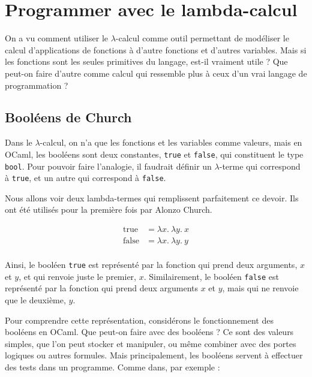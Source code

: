 \documentclass[11pt]{article}
\begin{document}
\section{Programmer avec le lambda-calcul}
On a vu comment utiliser le $\lambda$-calcul comme outil permettant de modéliser le calcul d'applications de fonctions à d'autre fonctions et d'autres variables. Mais si les fonctions sont les seules primitives du langage, est-il vraiment utile ? Que peut-on faire d'autre comme calcul qui ressemble plus à ceux d'un vrai langage de programmation ?

\subsection{Booléens de Church}
Dans le $\lambda$-calcul, on n'a que les fonctions et les variables comme valeurs, mais en OCaml, les booléens sont deux constantes, \verb|true| et \verb|false|, qui constituent le type \verb|bool|. Pour pouvoir faire l'analogie, il faudrait définir un $\lambda$-terme qui correspond à \verb|true|, et un autre qui correspond à \verb|false|.

Nous allons voir deux lambda-termes qui remplissent parfaitement ce devoir. Ils ont été utilisés pour la première fois par Alonzo Church.

\begin{definition}
    \begin{equation*}
    \begin{aligned}
        \operatorname{true} &= \lambda x.~\lambda y.~x\\
        \operatorname{false} &= \lambda x.~\lambda y.~y\\
    \end{aligned}
    \end{equation*}
\end{definition}

Ainsi, le booléen \verb|true| est représenté par la fonction qui prend deux arguments, $x$ et $y$, et qui renvoie juste le premier, $x$. Similairement, le booléen \verb|false| est représenté par la fonction qui prend deux arguments $x$ et $y$, mais qui ne renvoie que le deuxième, $y$.

Pour comprendre cette représentation, considérons le fonctionnement des booléens en OCaml. Que peut-on faire avec des booléens ? Ce sont des valeurs simples, que l'on peut stocker et manipuler, ou même combiner avec des portes logiques ou autres formules. Mais principalement, les booléens servent à effectuer des tests dans un programme. Comme dans, par exemple :
\end{document}
